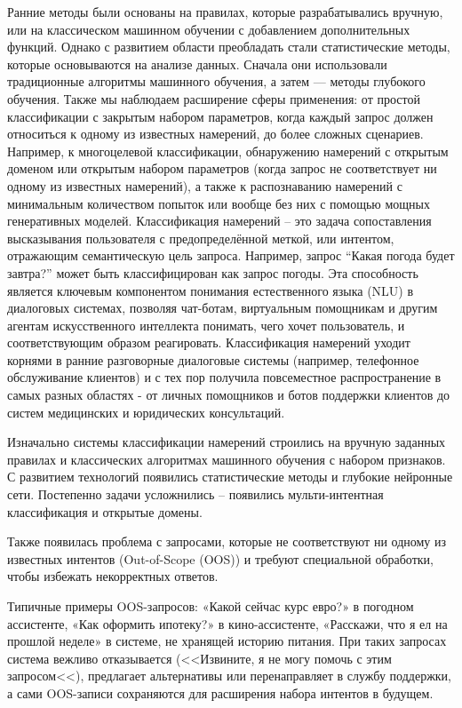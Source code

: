\documentclass[14pt,a4paper,oneside,openany]{extbook}
\begin{document}
Ранние методы были основаны на правилах, которые разрабатывались вручную, или на классическом машинном обучении с добавлением дополнительных функций. Однако с развитием области преобладать стали статистические методы, которые основываются на анализе данных. Сначала они использовали традиционные алгоритмы машинного обучения, а затем — методы глубокого обучения. Также мы наблюдаем расширение сферы применения: от простой классификации с закрытым набором параметров, когда каждый запрос должен относиться к одному из известных намерений, до более сложных сценариев. Например, к многоцелевой классификации, обнаружению намерений с открытым доменом или открытым набором параметров (когда запрос не соответствует ни одному из известных намерений), а также к распознаванию намерений с минимальным количеством попыток или вообще без них с помощью мощных генеративных моделей.
Классификация намерений – это задача сопоставления высказывания пользователя с предопределённой меткой, или интентом, отражающим семантическую цель запроса.  Например, запрос “Какая погода будет завтра?” может быть классифицирован как запрос погоды. Эта способность является ключевым компонентом понимания естественного языка (NLU) в диалоговых системах, позволяя чат-ботам, виртуальным помощникам и другим агентам искусственного интеллекта понимать, чего хочет пользователь, и соответствующим образом реагировать. Классификация намерений уходит корнями в ранние разговорные диалоговые системы (например, телефонное обслуживание клиентов) и с тех пор получила повсеместное распространение в самых разных областях - от личных помощников и ботов поддержки клиентов до систем медицинских и юридических консультаций.

Изначально системы классификации намерений строились на вручную заданных правилах и классических алгоритмах машинного обучения с набором признаков. С развитием технологий появились статистические методы и глубокие нейронные сети. Постепенно задачи усложнились – появились мульти-интентная классификация и открытые домены.

Также появилась проблема с запросами, которые не соответствуют ни одному из известных интентов (Out-of-Scope (OOS)) и требуют специальной обработки, чтобы избежать некорректных ответов.

Типичные примеры OOS-запросов: «Какой сейчас курс евро?» в погодном ассистенте, «Как оформить ипотеку?» в кино-ассистенте, «Расскажи, что я ел на прошлой неделе» в системе, не хранящей историю питания. При таких запросах система вежливо отказывается (<<Извините, я не могу помочь с этим запросом<<), предлагает альтернативы или перенаправляет в службу поддержки, а сами OOS-записи сохраняются для расширения набора интентов в будущем.
\end{document}
